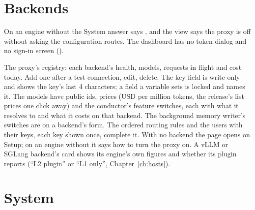 

\section{Backends}

On an engine without  the System answer says , and the view says the proxy is off without asking the configuration routes. The dashboard has no token dialog and no sign-in screen ().


The proxy's registry: each backend's health, models, requests in flight and cost today. Add one after a test connection, edit, delete. The key field is write-only and shows the key's last 4 characters; a field a  variable sets is locked and names it. The models have public ids, prices (USD per million tokens, the release's list prices one click away) and the conductor's feature switches, each with what it resolves to and what it costs on that backend. The background memory writer's switches are on a backend's form. The ordered routing rules and the users with their keys, each key shown once, complete it. With no backend the page opens on Setup; on an engine without  it says how to turn the proxy on. A vLLM or SGLang backend's card shows its engine's own figures and whether its plugin reports (\enquote{L2 plugin} or \enquote{L1 only}, Chapter~\ref{ch:hosts}).

\section{System}

